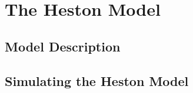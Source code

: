 \section{The Heston Model}

\subsection{Model Description}

\subsection{Simulating the Heston Model}